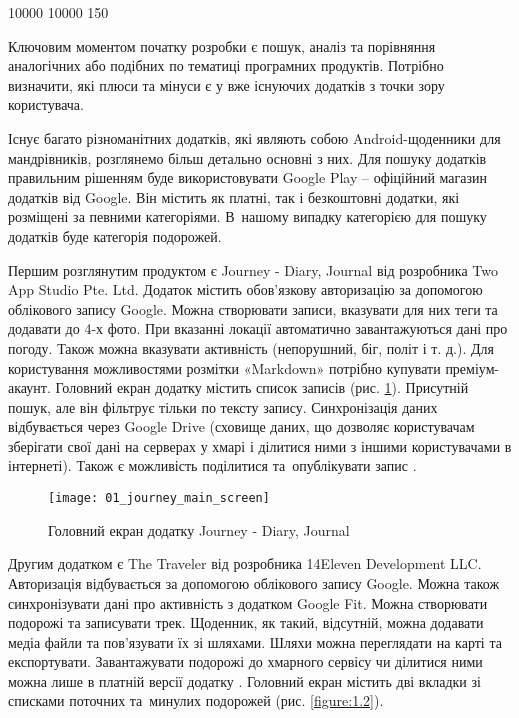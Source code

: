 \documentclass[../main.tex]{subfiles}
\begin{document}
{

 10000 10000 150 %

Ключовим моментом початку розробки є пошук, аналіз та порівняння аналогічних або подібних по тематиці програмних продуктів. Потрібно визначити, які плюси та мінуси є у вже існуючих додатків з точки зору користувача.

Існує багато різноманітних додатків, які являють собою Android-щоденники для мандрівників, розглянемо більш детально основні з них. Для пошуку додатків правильним рішенням буде використовувати Google Play -- офіційний магазин додатків від Google. Він містить як платні, так і безкоштовні додатки, які розміщені за певними категоріями. В~нашому випадку категорією для пошуку додатків буде категорія подорожей.

\newpage
Першим розглянутим продуктом є Journey - Diary, Journal від розробника Two App Studio Pte. Ltd. Додаток містить обов'язкову авторизацію за допомогою облікового запису Google. Можна створювати записи, вказувати для них теги та додавати до 4-х фото. При вказанні локації автоматично завантажуються дані про погоду. Також можна вказувати активність (непорушний, біг, політ і т. д.). Для користування можливостями розмітки «Markdown» потрібно купувати преміум-акаунт. Головний екран додатку містить список записів (рис. \ref{figure:1.1}). Присутній пошук, але він фільтрує тільки по тексту запису. Синхронізація даних відбувається через Google Drive (сховище даних, що дозволяє користувачам зберігати свої дані на серверах у хмарі і ділитися ними з іншими користувачами в інтернеті). Також є можливість поділитися та~опублікувати запис \cite{journey_app}. 

\begin{figure}[H]
\centering
\texttt{[image: 01\_journey\_main\_screen]}
\caption{Головний екран додатку Journey - Diary, Journal}
\label{figure:1.1}
\end{figure}

\newpage
Другим додатком є The Traveler від розробника 14Eleven Development LLC. Авторизація відбувається за допомогою облікового запису Google. Можна також синхронізувати дані про активність з додатком Google Fit. Можна створювати подорожі та записувати трек. Щоденник, як такий, відсутній, можна додавати медіа файли та пов'язувати їх зі шляхами. Шляхи можна переглядати на карті та експортувати. Завантажувати подорожі до хмарного сервісу чи ділитися ними можна лише в платній версії додатку \cite{the_traveler_app}. Головний екран містить дві вкладки зі списками поточних та~минулих подорожей (рис. \ref{figure:1.2}). 

}
\end{document}
